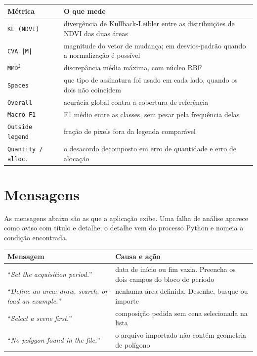 \documentclass[12pt,a4paper]{article}
\newcommand{\msg}[1]{``\textit{#1}''}
\begin{document}
\begin{center}
\label{tab:dominio}
\small
\renewcommand{\arraystretch}{1.18}
\begin{tabular}{@{}L{3.4cm}L{12.2cm}@{}}
\toprule
\textbf{M\'etrica} & \textbf{O que mede} \\
\midrule
\texttt{KL (NDVI)} & diverg\^encia de Kullback-Leibler entre as distribui\c{c}\~oes de NDVI das duas \'areas \\
\texttt{CVA |M|} & magnitude do vetor de mudan\c{c}a; em desvios-padr\~ao quando a normaliza\c{c}\~ao \'e poss\'ivel \\
\texttt{MMD$^2$} & discrep\^ancia m\'edia m\'axima, com n\'ucleo RBF \\
\texttt{Spaces} & que tipo de assinatura foi usado em cada lado, quando os dois n\~ao coincidem \\
\texttt{Overall} & acur\'acia global contra a cobertura de refer\^encia \\
\texttt{Macro F1} & F1 m\'edio entre as classes, sem pesar pela frequ\^encia delas \\
\texttt{Outside legend} & fra\c{c}\~ao de pixels fora da legenda compar\'avel \\
\texttt{Quantity / alloc.} & o desacordo decomposto em erro de quantidade e erro de aloca\c{c}\~ao \\
\bottomrule
\end{tabular}
\end{center}

\section{Mensagens}
\label{ap:mensagens}

As mensagens abaixo s\~ao as que a aplica\c{c}\~ao exibe. Uma falha de
an\'alise aparece como aviso com t\'itulo e detalhe; o detalhe vem do processo
Python e nomeia a condi\c{c}\~ao encontrada.

\begin{center}
\label{tab:recusa}
\small
\renewcommand{\arraystretch}{1.18}
\begin{tabular}{@{}L{7.6cm}L{8.0cm}@{}}
\toprule
\textbf{Mensagem} & \textbf{Causa e a\c{c}\~ao} \\
\midrule
\msg{Set the acquisition period.} & data de in\'icio ou fim vazia. Preencha os dois campos do bloco de per\'iodo \\
\msg{Define an area: draw, search, or load an example.} & nenhuma \'area definida. Desenhe, busque ou importe \\
\msg{Select a scene first.} & composi\c{c}\~ao pedida sem cena selecionada na lista \\
\msg{No polygon found in the file.} & o arquivo importado n\~ao cont\'em geometria de pol\'igono \\
\bottomrule
\end{tabular}
\end{center}
\end{document}
